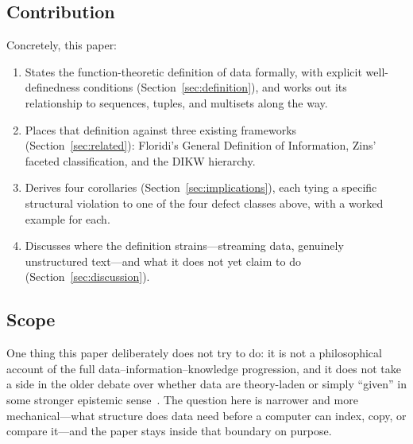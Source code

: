 \subsection{Contribution}

Concretely, this paper:
\begin{enumerate}
  \item States the function-theoretic definition of data formally, with
        explicit well-definedness conditions
        (Section~\ref{sec:definition}), and works out its relationship to
        sequences, tuples, and multisets along the way.
  \item Places that definition against three existing frameworks
        (Section~\ref{sec:related}): Floridi's General Definition of
        Information, Zins' faceted classification, and the DIKW hierarchy.
  \item Derives four corollaries (Section~\ref{sec:implications}), each
        tying a specific structural violation to one of the four defect
        classes above, with a worked example for each.
  \item Discusses where the definition strains---streaming data,
        genuinely unstructured text---and what it does not yet claim to
        do (Section~\ref{sec:discussion}).
\end{enumerate}

\subsection{Scope}

One thing this paper deliberately does not try to do: it is not a
philosophical account of the full data--information--knowledge
progression, and it does not take a side in the older debate over whether
data are theory-laden or simply ``given'' in some stronger epistemic
sense~\autocite{floridi2005}. The question here is narrower and more
mechanical---what structure does data need before a computer can index,
copy, or compare it---and the paper stays inside that boundary on purpose.